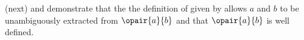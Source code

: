 (next) and  demonstrate that the 
the definition of  given by 
allows $a$ and $b$ to be unambiguously extracted from $\opair{a}{b}$ 
and that $\opair{a}{b}$ is well defined.
\begin{proposition}
\label{prop:(a,b)_extract}
\end{proposition}

